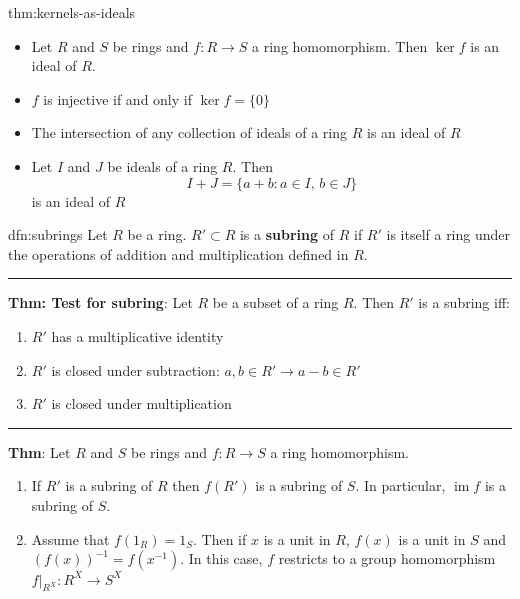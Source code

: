 \documentclass[landscape, 8pt]{extarticle}
\DeclareMathOperator{\im}{im}
\begin{document}
\begin{multicols}{3}
\begin{thm}{thm:kernels-as-ideals}{}

    \begin{itemize}[leftmargin=*]
        \setlength\itemsep{0em}
        \item Let $R$ and $S$ be rings and $f : R\to S$ a ring homomorphism. Then $\ker f$ is an ideal of $R$.
        \item $f$ is injective if and only if $\ker f = \{0\}$
        \item The intersection of any collection of ideals of a ring $R$ is an ideal of $R$
        \item Let $I$ and $J$ be ideals of a ring $R$. Then
            \[I + J = \{a + b : a\in I,\, b\in J\}\]
            is an ideal of $R$
    \end{itemize}
\end{thm}

\begin{dfn}[Subrings]{dfn:subrings}{}
    Let $R$ be a ring. $R' \subset R$ is a \textbf{subring} of $R$ if $R'$ is itself a ring under the operations of addition and multiplication defined in $R$.

    \noindent\rule{\textwidth}{0.2pt}
    \textbf{Thm: Test for subring}: Let $R$ be a subset of a ring $R$. Then $R'$ is a subring iff:
    \begin{enumerate}
        \setlength\itemsep{0em}
        \item $R'$ has a multiplicative identity
        \item $R'$ is closed under subtraction: $a,b\in R' \to a-b\in R'$
        \item $R'$ is closed under multiplication
    \end{enumerate}

    \noindent\rule{\textwidth}{0.2pt}
    \textbf{Thm}: Let $R$ and $S$ be rings and $f : R \to S$ a ring homomorphism.
    \begin{enumerate}
        \setlength\itemsep{0em}
        \item If $R'$ is a subring of $R$ then $f(R')$ is a subring of $S$. In particular, $\im f$ is a subring of $S$.
        \item Assume that $f(1_{R}) = 1_{S}$. Then if $x$ is a unit in $R$, $f(x)$ is a unit in $S$ and $(f(x))^{-1} = f(x^{-1})$. In this case, $f$ restricts to a group homomorphism $f \rvert_{R^{X}} : R^{X} \to S^{X}$
    \end{enumerate}
\end{dfn}


\end{multicols}
\end{document}
